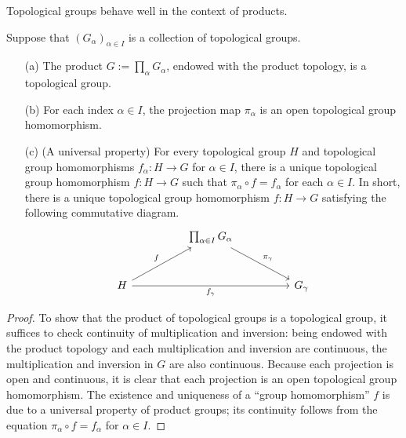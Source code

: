 Topological groups behave well in the context of products.
\begin{prop}
    Suppose that $(G_\alpha)_{\alpha\in I}$ is a collection of topological groups.
    \begin{enumerate}
        \item[(a)]
        {
            The product $G:=\prod_\alpha G_\alpha$, endowed with the product topology, is a topological group.
        }
        \item[(b)]
        {
            For each index $\alpha\in I$, the projection map $\pi_\alpha$ is an open topological group homomorphism.
        }
        \item[(c)]
        {
            (A universal property)
            For every topological group $H$ and topological group homomorphisms $f_\alpha: H\rightarrow G$ for $\alpha\in I$, there is a unique topological group homomorphism $f: H\rightarrow G$ such that $\pi_\alpha\circ f=f_\alpha$ for each $\alpha\in I$.
            In short, there is a unique topological group homomorphism $f: H\rightarrow G$ satisfying the following commutative diagram.
            \begin{equation*}
            \begin{tikzcd}[row sep=large, column sep=huge]
                &
                \prod_{\alpha\in I} G_\alpha
                \arrow[dr, "\pi_\gamma"]
                &\\
                H\arrow[ur, "f"]\arrow[rr, "f_\gamma"']
                &
                &
                G_\gamma
            \end{tikzcd}
            \end{equation*}
        }
    \end{enumerate}
\end{prop}
\begin{proof}
    To show that the product of topological groups is a topological group, it suffices to check continuity of multiplication and inversion: being endowed with the product topology and each multiplication and inversion are continuous, the multiplication and inversion in $G$ are also continuous.
    Because each projection is open and continuous, it is clear that each projection is an open topological group homomorphism.
    The existence and uniqueness of a ``group homomorphism'' $f$ is due to a universal property of product groups; its continuity follows from the equation $\pi_\alpha\circ f=f_\alpha$ for $\alpha\in I$.
\end{proof}

